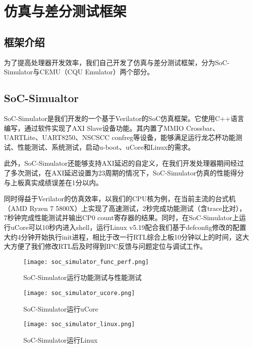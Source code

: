 \chapter{仿真与差分测试框架}

\section{框架介绍}

为了提高处理器开发效率，我们自己开发了仿真与差分测试框架，分为SoC-Simulator与CEMU（CQU Emulator）两个部分。

\section{SoC-Simualtor}

SoC-Simulator是我们开发的一个基于Verilator的SoC仿真框架。它使用C++语言编写，通过软件实现了AXI Slave设备功能。其内置了MMIO Crossbar、UARTLite、UART8250、NSCSCC confreg等设备，能够满足运行龙芯杯功能测试、性能测试、系统测试，启动u-boot、uCore和Linux的需求。

此外，SoC-Simulator还能够支持AXI延迟的自定义，在我们开发处理器期间经过了多次测试，在AXI延迟设置为23周期的情况下，SoC-Simulator仿真的性能得分与上板真实成绩误差在1分以内。

同时得益于Verilator的仿真效率，以我们的CPU核\cpuname 为例，在当前主流的台式机（AMD Ryzen 7 5800X）上实现了高速测试，2秒完成功能测试（含trace比对），7秒钟完成性能测试并输出CP0 count寄存器的结果。同时，在SoC-Simulator上运行uCore可以10秒内进入shell，运行Linux v5.19配合我们基于defconfig修改的配置大约4分钟开始执行init进程，相比于改一行RTL综合上板10分钟以上的时间，这大大方便了我们修改RTL后及时得到IPC反馈与问题定位与调试工作。

\begin{figure}[h]
    \centering
    \texttt{[image: soc\_simulator\_func\_perf.png]}
    \caption{SoC-Simulator运行功能测试与性能测试}
\end{figure}

\begin{figure}[h]
    \centering
    \texttt{[image: soc\_simulator\_ucore.png]}
    \caption{SoC-Simulator运行uCore}
\end{figure}

\begin{figure}[h]
    \centering
    \texttt{[image: soc\_simulator\_linux.png]}
    \caption{SoC-Simulator运行Linux}
\end{figure}

